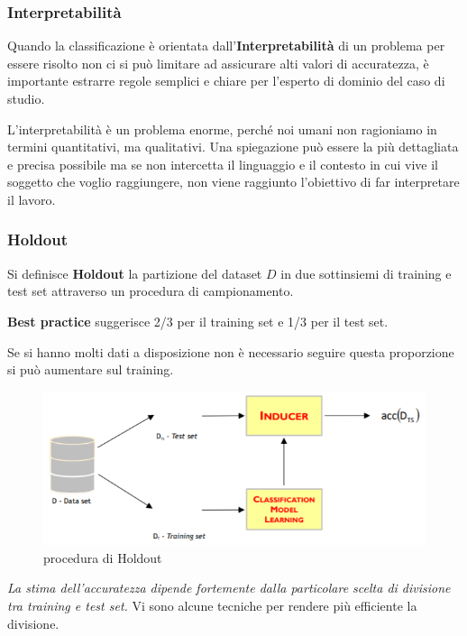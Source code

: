 \subsubsection{Interpretabilità}
\begin{defn}
Quando la classificazione è orientata dall'\textbf{Interpretabilità} di un problema per essere risolto  non ci si può limitare ad assicurare alti valori di accuratezza, è importante estrarre regole semplici e chiare per l'esperto di dominio del caso di studio.
\end{defn}
L'interpretabilità è un problema enorme, perché noi umani non ragioniamo in termini quantitativi, ma qualitativi. Una spiegazione può essere la più dettagliata e precisa possibile ma se non intercetta il linguaggio e il contesto in cui vive il soggetto che voglio raggiungere, non viene raggiunto l'obiettivo di far interpretare il lavoro.

\subsubsection{Holdout}
\begin{defn}
	Si definisce \textbf{Holdout} la partizione del dataset $D$ in due sottinsiemi di training e test set attraverso un procedura di campionamento. 
\end{defn}

\textbf{Best practice} suggerisce 2/3 per il training set e 1/3 per il test set.

Se si hanno molti dati a disposizione non \`e necessario seguire questa proporzione si pu\`o aumentare sul training.\\

\begin{figure}[H]
	\centering
	\includegraphics[height=0.3 \linewidth]{classification/pict/holdout.png}
	\caption{procedura di Holdout}
\end{figure}
\textit{La stima dell'accuratezza dipende fortemente dalla particolare scelta di divisione tra training e test set.} Vi sono alcune tecniche per rendere più efficiente la divisione.


